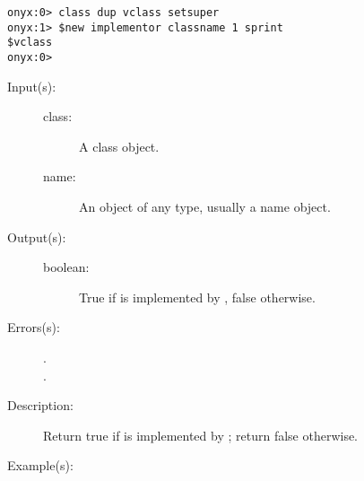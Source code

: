 \begin{description}
\begin{description}
\begin{verbatim}
onyx:0> class dup vclass setsuper
onyx:1> $new implementor classname 1 sprint
$vclass
onyx:0>
		\end{verbatim}
	\end{description}
\label{systemdict:implements}
\item[{\onyxop{class name}{implements}{boolean}}: ]
	\begin{description}\item[]
	\item[Input(s): ]
		\begin{description}\item[]
		\item[class: ]
			A class object.
		\item[name: ]
			An object of any type, usually a name object.
		\end{description}
	\item[Output(s): ]
		\begin{description}\item[]
		\item[boolean: ]
			True if  is implemented by ,
			false otherwise.
		\end{description}
	\item[Errors(s): ]
		\begin{description}\item[]
		\item[.]
		\item[.]
		\end{description}
	\item[Description: ]
		Return true if  is implemented by ;
		return false otherwise.
	\item[Example(s): ]\begin{verbatim}


\end{verbatim}
\end{description}
\end{description}
